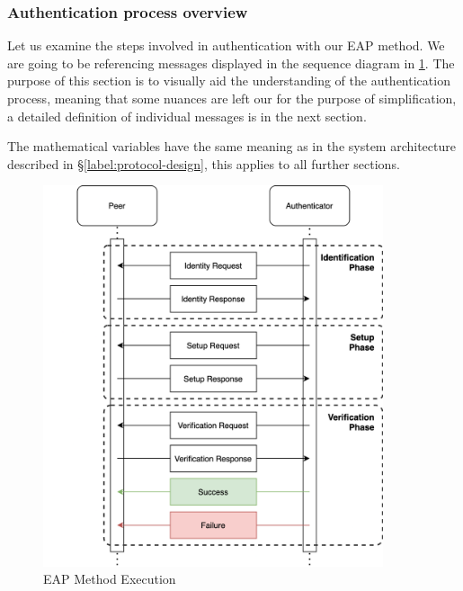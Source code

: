 \subsubsection{Authentication process overview}
Let us examine the steps involved in authentication with our EAP method. We are going to be referencing messages displayed in the sequence diagram in \ref{fig:eap-84}.
The purpose of this section is to visually aid the understanding of the authentication process, meaning that some nuances are left our for the purpose of simplification, a detailed definition of individual messages is in the next section.

The mathematical variables have the same meaning as in the system architecture described in \S\ref{label:protocol-design}, this applies to all further sections.

\begin{figure}[h!]
	\centering
	\includegraphics[width=10cm]{images/eap-zkp}
	\caption{EAP Method Execution}
	\label{fig:eap-84}
\end{figure}

